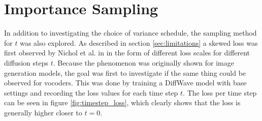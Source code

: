\documentclass{report}
\begin{document}

\section{Importance Sampling} \label{sec:imps}

In addition to investigating the choice of variance schedule, the sampling method for $t$ was also explored. As described in section \ref{sec:limitations} a skewed loss was first observed by Nichol et al. in \cite{nichol2021improved} in the form of different loss scales for different diffusion steps $t$. Because the phenomenon was originally shown for image generation models, the goal was first to investigate if the same thing could be observed for vocoders. This was done by training a DiffWave model with base settings and recording the loss values for each time step $t$. The loss per time step can be seen in figure \ref{fig:timestep_loss}, which clearly shows that the loss is generally higher closer to $t=0$.
\end{document}
